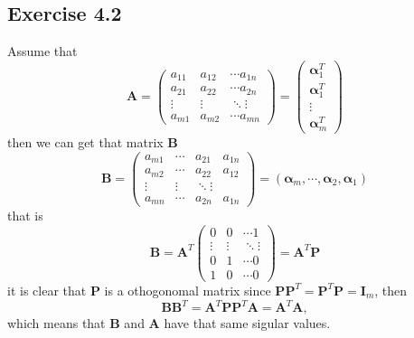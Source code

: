 \documentclass{article}
\begin{document}
\subsection{Exercise 4.2}
Assume that
$$
\bm{A} = \begin{pmatrix}
	a_{11} & a_{12} & \cdots a_{1n} \\
	a_{21} & a_{22} & \cdots a_{2n} \\
	\vdots & \vdots & \ddots \vdots \\
	a_{m1} & a_{m2} & \cdots a_{mn}
\end{pmatrix} = \begin{pmatrix}
	\bm{\alpha}_1^T \\
	\bm{\alpha}_1^T\\ 
	\vdots \\
	\bm{\alpha}_m^T\end{pmatrix}
$$
then we can get that matrix $\bm{B}$
$$
\bm{B} = \begin{pmatrix}
	a_{m1} & \cdots & a_{21} & a_{1n} \\
	a_{m2} & \cdots & a_{22} & a_{12}\\
	\vdots & \vdots & \ddots \vdots \\
	a_{mn} & \cdots & a_{2n} & a_{1n}
\end{pmatrix} = \left(\bm{\alpha}_m, \cdots, \bm{\alpha}_2, \bm{\alpha}_1 \right)
$$
that is 
$$
\bm{B} = \bm{A}^T \begin{pmatrix}
	0 & 0 & \cdots 1 \\
	\vdots & \vdots & \ddots \vdots \\
	0 & 1 & \cdots 0 \\
	1 & 0 & \cdots 0
\end{pmatrix} = \bm{A}^T \bm{P}
$$
it is clear that $\bm{P}$ is a othogonomal matrix since $\bm{P}\bm{P}^T = \bm{P}^T \bm{P} = \bm{I}_m$, then
$$
\bm{B} \bm{B}^T = \bm{A}^T \bm{P} \bm{P}^T \bm{A} = \bm{A}^T \bm{A},
$$
which means that $\bm{B}$ and $\bm{A}$ have that same sigular values.
\end{document}
